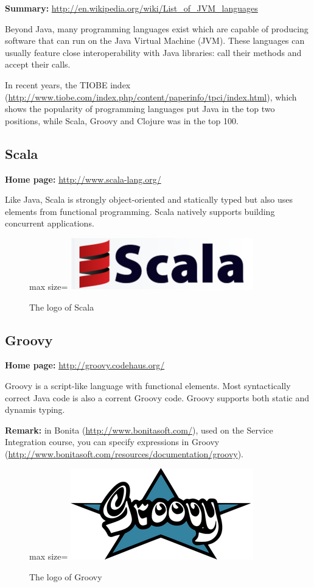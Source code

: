 \documentclass[]{report}
\let\Oldincludegraphics\includegraphics
\renewcommand{\includegraphics}[1]{
\begin{adjustbox}{max size={\textwidth}{\textheight}}
    \Oldincludegraphics[scale=0.6]{#1}%
\end{adjustbox}
}
\begin{document}
\textbf{Summary:}
\url{http://en.wikipedia.org/wiki/List_of_JVM_languages}

Beyond Java, many programming languages exist which are capable of
producing software that can run on the Java Virtual Machine (JVM). These
languages can usually feature close interoperability with Java
libraries: call their methods and accept their calls.

In recent years, the TIOBE index
(\url{http://www.tiobe.com/index.php/content/paperinfo/tpci/index.html}),
which shows the popularity of programming languages put Java in the top
two positions, while Scala, Groovy and Clojure was in the top 100.

\subsection{Scala}

\textbf{Home page:} \url{http://www.scala-lang.org/}

Like Java, Scala is strongly object-oriented and statically typed but
also uses elements from functional programming. Scala natively supports
building concurrent applications.

\begin{figure}[htbp]
\centering
\includegraphics{img/code_generation/scala_logo.png}
\caption{The logo of Scala}
\end{figure}

\subsection{Groovy}

\textbf{Home page:} \url{http://groovy.codehaus.org/}

Groovy is a script-like language with functional elements. Most
syntactically correct Java code is also a corrent Groovy code. Groovy
supports both static and dynamis typing.

\textbf{Remark:} in Bonita (\url{http://www.bonitasoft.com/}), used on
the Service Integration course, you can specify expressions in Groovy
(\url{http://www.bonitasoft.com/resources/documentation/groovy}).

\begin{figure}[htbp]
\centering
\includegraphics{img/code_generation/groovy_logo.png}
\caption{The logo of Groovy}
\end{figure}
\end{document}
